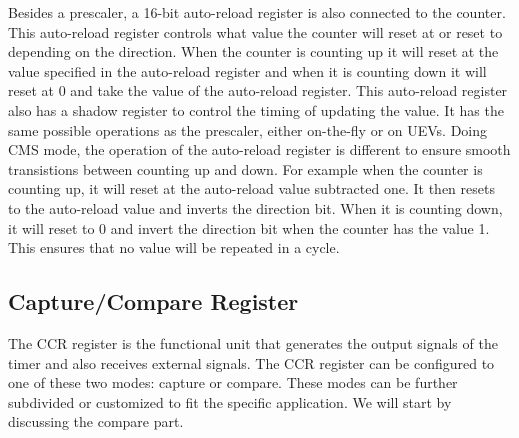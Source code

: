 \documentclass[./dissertation.tex]{subfiles}
\begin{document}
Besides a prescaler, a 16-bit auto-reload register is also connected to the counter. This auto-reload register controls what value the counter will reset at or reset to depending on the direction. When the counter is counting up it will reset at the value specified in the auto-reload register and when it is counting down it will reset at 0 and take the value of the auto-reload register. This auto-reload register also has a shadow register to control the timing of updating the value. It has the same possible operations as the prescaler, either on-the-fly or on UEVs. Doing CMS mode, the operation of the auto-reload register is different to ensure smooth transistions between counting up and down. For example when the counter is counting up, it will reset at the auto-reload value subtracted one. It then resets to the auto-reload value and inverts the direction bit. When it is counting down, it will reset to 0 and invert the direction bit when the counter has the value 1. This ensures that no value will be repeated in a cycle. 

\subsection{Capture/Compare Register}
The CCR register is the functional unit that generates the output signals of the timer and also receives external signals. The CCR register can be configured to one of these two modes: capture or compare. These modes can be further subdivided or customized to fit the specific application. We will start by discussing the compare part.
\end{document}
